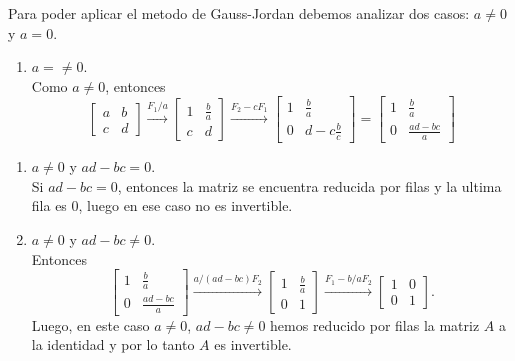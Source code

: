 \documentclass{article}
\theoremstyle{definition}
\theoremstyle{definition}
\theoremstyle{remark}
\begin{document}
Para poder aplicar el metodo de Gauss-Jordan debemos analizar dos casos: $a \neq 0$ y $a = 0$. \begin{enumerate}[label=\textbf{Caso \arabic*}]
    \item  $a=\neq 0$. \\
      Como $a \neq 0$, entonces \[
        \begin{bmatrix}a & b \\ c & d \end{bmatrix} \xrightarrow{F_1 / a} \begin{bmatrix} 1 & \frac{b}{a} \\ c & d \end{bmatrix} \xrightarrow{F_2-cF_1} \begin{bmatrix}1 & \frac{b}{a} \\ 0 & d- c \frac{b}{c} \end{bmatrix} = \begin{bmatrix} 1 & \frac{b}{a} \\ 0 & \frac{ad-bc}{a} \end{bmatrix}
      \]
 \end{enumerate}
 \begin{enumerate}[label=\textbf{Caso 1.\arabic*}]
   \item $a \neq 0$ y $ad-bc=0$. \\
     Si $ad-bc=0$, entonces la matriz se encuentra reducida por filas y la ultima fila es $0$, luego en ese caso no es invertible. 
   \item $a \neq 0$ y $ad-bc \neq 0$. \\
     Entonces \[
       \begin{bmatrix} 1 & \frac{b}{a} \\ 0 & \frac{ad-bc}{a} \end{bmatrix}  \xrightarrow{a/(ad-bc)F_2} \begin{bmatrix} 1&  \frac{b}{a} \\ 0 & 1 \end{bmatrix} \xrightarrow{F_1-b/aF_2} \begin{bmatrix} 1 & 0 \\ 0 & 1 \end{bmatrix}.
     \]
     Luego, en este caso $a \neq 0$, $ad-bc \neq 0$ hemos reducido por filas la matriz $A$ a la identidad y por lo tanto $A$ es invertible.
   \end{enumerate}
\end{document}
